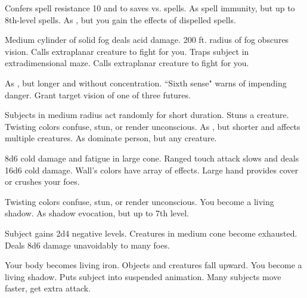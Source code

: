 \begin{swspelllist}
  \M\F Confers spell resistance 10 and  to saves vs. spells.
   As spell immunity, but up to 8th-level spells.
   As , but you gain the effects of dispelled spells.

   Medium cylinder of solid fog deals acid damage.
   200 ft. radius of fog obscures vision.
   Calls extraplanar creature to fight for you.
   Traps subject in extradimensional maze.
   Calls extraplanar creature to fight for you.

   As , but longer and without concentration.
   ``Sixth sense" warns of impending danger.
   Grant target vision of one of three futures.

   Subjects in medium radius act randomly for short duration.
   Stuns a creature.
   Twisting colors confuse, stun, or render unconscious.
   As , but shorter and affects multiple creatures.
   As dominate person, but any creature.

   8d6 cold damage and fatigue in large cone.
   Ranged touch attack slows and deals 16d6 cold damage.
   Wall's colors have array of effects.
   Large hand provides cover or crushes your foes.

   Twisting colors confuse, stun, or render unconscious.
   You become a living shadow.
   As shadow evocation, but up to 7th level.

   Subject gains 2d4 negative levels.
   Creatures in medium cone become exhausted.
   Deals 8d6 damage unavoidably to many foes.

   Your body becomes living iron.
   Objects and creatures fall upward.
   You become a living shadow.
  \M Puts subject into suspended animation.
   Many subjects move faster, get extra attack.
\end{swspelllist}

